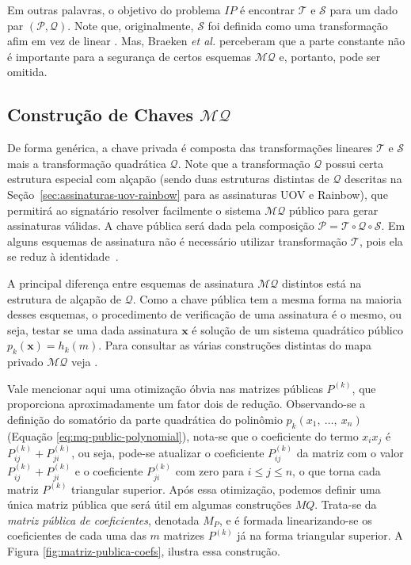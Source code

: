 \documentclass{SBCbookchapter}
\newcommand{\MQ}{\mathcal{MQ}}
\begin{document}
\begin{otherlanguage}{brazilian}
Em outras palavras, o objetivo do problema $IP$ é encontrar $\mathcal{T}$ e $\mathcal{S}$ para um dado par $(\mathcal{P},\mathcal{Q})$. Note que, originalmente, $\mathcal{S}$ foi definida como uma transformação afim em vez de linear \cite{patarin-goubin-courtois}. Mas,  Braeken \emph{et al.} \cite[Sec. 3.1]{braeken-wolf-preneel} perceberam que a parte constante não é importante para a segurança de certos esquemas $\MQ$ e, portanto, pode ser omitida.

\subsection{Construção de Chaves $\MQ$}

De forma genérica, a chave privada é composta das transformações lineares $\mathcal{T}$ e $\mathcal{S}$ mais a transformação quadrática $\mathcal{Q}$. Note que a transformação $\mathcal{Q}$ possui certa estrutura especial com alçapão (sendo duas estruturas distintas de $\mathcal{Q}$ descritas na Seção~\ref{sec:assinaturas-uov-rainbow} para as assinaturas UOV e Rainbow), que permitirá ao signatário resolver facilmente o sistema $\MQ$ público para gerar assinaturas válidas. A chave pública será dada pela composição $\mathcal{P} = \mathcal{T} \circ \mathcal{Q} \circ \mathcal{S}$. Em alguns esquemas de assinatura não é necessário utilizar transformação $\mathcal{T}$, pois ela se reduz à identidade~\cite[Capítulo~6]{bernstein-buchmann-dahmen}.

A principal diferença entre esquemas de assinatura $\MQ$ distintos está na estrutura de alçapão de $\mathcal{Q}$. Como a chave pública tem a mesma forma na maioria desses esquemas, o procedimento de verificação de uma assinatura é o mesmo, ou seja, testar se uma dada assinatura $\textbf{x}$ é solução de um sistema quadrático público $p_k(\textbf{x})=h_k(m)$. Para consultar as várias construções distintas do mapa privado $\MQ$ veja \cite{wolf-preneel-taxonomy}.

Vale mencionar aqui uma otimização óbvia nas matrizes públicas $P^{(k)}$, que proporciona aproximadamente um fator dois de redução. Observando-se a definição do somatório da parte quadrática do polinômio $p_k(x_1,~\dots,~x_n)$ (Equação \ref{eq:mq-public-polynomial}), nota-se que o coeficiente do termo $x_i x_j$ é $P^{(k)}_{ij} + P^{(k)}_{ji}$, ou seja, pode-se atualizar o coeficiente $P^{(k)}_{ij}$ da matriz com o valor $P^{(k)}_{ij} + P^{(k)}_{ji}$ e o coeficiente $P^{(k)}_{ji}$ com zero para $i \leq j \leq n$, o que torna cada matriz $P^{(k)}$ triangular superior. Após essa otimização, podemos definir uma única matriz pública que será útil em algumas construções $MQ$. Trata-se da \emph{matriz pública de coeficientes}, denotada $M_{P}$, e é formada linearizando-se os coeficientes de cada uma das $m$ matrizes $P^{(k)}$ já na forma triangular superior. A Figura \ref{fig:matriz-publica-coefs}, ilustra essa construção.


\end{otherlanguage}
\end{document}
